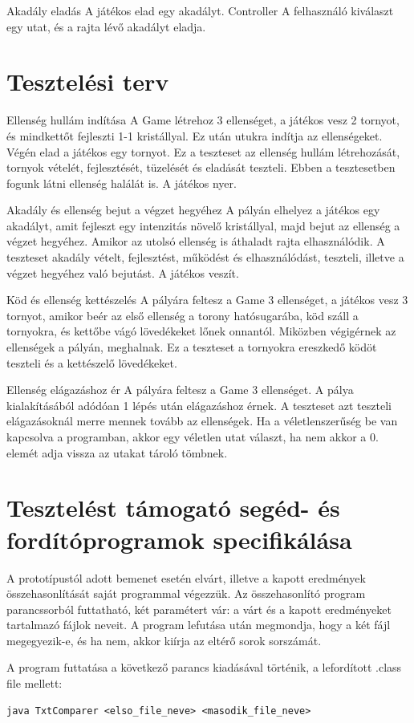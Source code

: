 \usecase
{Akadály eladás}
{A játékos elad egy akadályt.}
{Controller}
{A felhasználó kiválaszt egy utat, és a rajta lévő akadályt eladja.}


\section{Tesztelési terv}

\teszteset
{Ellenség hullám indítása}
{A Game létrehoz 3 ellenséget, a játékos vesz 2 tornyot, és mindkettőt fejleszti 1-1 kristállyal. Ez után utukra indítja az ellenségeket. Végén elad a játékos egy tornyot.}
{Ez a teszteset az ellenség hullám létrehozását, tornyok vételét, fejlesztését, tüzelését és eladását teszteli. 
Ebben a tesztesetben fogunk látni ellenség halálát is. A játékos nyer.
}

\teszteset
{Akadály és ellenség bejut a végzet hegyéhez}
{A pályán elhelyez a játékos egy akadályt, amit fejleszt egy intenzitás növelő kristállyal, majd bejut az ellenség a végzet hegyéhez. Amikor az utolsó ellenség is áthaladt rajta elhasználódik.}
{A teszteset akadály vételt, fejlesztést, működést és elhasználódást, teszteli, illetve a végzet hegyéhez való bejutást. A játékos veszít.}

\teszteset
{Köd és ellenség kettészelés}
{A pályára feltesz a Game 3 ellenséget, a játékos vesz 3 tornyot, amikor beér az első ellenség a torony hatósugarába, köd száll a tornyokra, és kettőbe vágó lövedékeket lőnek onnantól. Miközben végigérnek az ellenségek a pályán, meghalnak.}
{Ez a teszteset a tornyokra ereszkedő ködöt teszteli és a kettészelő lövedékeket. }

\teszteset
{Ellenség elágazáshoz ér}
{A pályára feltesz a Game 3 ellenséget.
A pálya kialakításából adódóan 1 lépés után elágazáshoz érnek. 
}
{A teszteset azt teszteli elágazásoknál merre mennek tovább az ellenségek.
Ha a véletlenszerűség be van kapcsolva a programban, akkor egy véletlen utat választ, ha nem akkor a 0. elemét adja vissza az utakat tároló tömbnek.
}


\section{Tesztelést támogató segéd- és fordítóprogramok specifikálása}
A prototípustól adott bemenet esetén elvárt, illetve a kapott eredmények összehasonlítását saját programmal végezzük. Az összehasonlító program parancssorból futtatható, két paramétert vár: a várt és a kapott eredményeket tartalmazó fájlok neveit. A program lefutása után megmondja, hogy a két fájl megegyezik-e, és ha nem, akkor kiírja az eltérő sorok sorszámát.

A program futtatása a következő parancs kiadásával történik, a lefordított .class file mellett:
\begin{verbatim}
java TxtComparer <elso_file_neve> <masodik_file_neve>
\end{verbatim}

